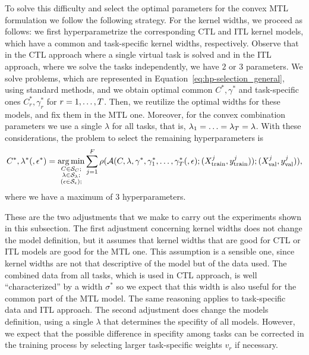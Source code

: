 To solve this difficulty and select the optimal parameters for the convex MTL formulation we follow the following strategy.
%
For the kernel widths, we proceed as follows: we first hyperparametrize the corresponding CTL and ITL kernel models, which have a common and task-specific kernel widths, respectively. 
Observe that in the CTL approach where a single virtual task is solved and in the ITL approach, where we solve the tasks independently, we have $2$ or $3$ parameters. We solve problems, which are represented in Equation~\eqref{eq:hp-selection_general}, using standard methods, and we obtain optimal common $C^*, \gamma^*$ and task-specific ones $C_r^*, \gamma^*_r$ for $r=1, \ldots, T$.
Then, we reutilize the optimal widths for these models, and fix them in the MTL one.
%
Moreover, for the convex combination parameters we use a single $\lambda$ for all tasks, that is, $\lambda_1 = \ldots = \lambda_T = \lambda$.
%
With these considerations, the problem to select the remaining hyperparameters is 
\begin{equation}
    \nonumber
    C^*, \lambda^* (, \epsilon^*) = \operatorname*{arg\min}_{\substack{C \in \mathcal{S}_C ; \\ \substack{\lambda \in \mathcal{S}_\lambda} ; \\ \left(\substack{\epsilon \in \mathcal{S}_\epsilon} \right); }}
     \sum_{j=1}^{F} \rho(\mathcal{A}(C, \lambda, \gamma^*, \gamma_1^*, \ldots, \gamma_T^* (, \epsilon); (X^j_\text{train}, y^j_\text{train})); (X^j_\text{val}, y^j_\text{val})) ,
\end{equation}
where we have a maximum of $3$ hyperparameters.

%
These are the two adjustments that we make to carry out the experiments shown in this subsection.
The first adjustment concerning kernel widths does not change the model definition, but it assumes that kernel widths that are good for CTL or ITL models are good for the MTL one. This assumption is a sensible one, since kernel widths are not that descriptive of the model but of the data used. The combined data from all tasks, which is used in CTL approach, is well ``characterized'' by a width $\sigma^*$ so we expect that this width is also useful for the common part of the MTL model. The same reasoning applies to task-specific data and ITL approach.
%
The second adjustment does change the models definition, using a single $\lambda$ that determines the specifity of all models. However, we expect that the possible difference in specifity among tasks can be corrected in the training process by selecting larger task-specific weights $v_r$ if necessary.

